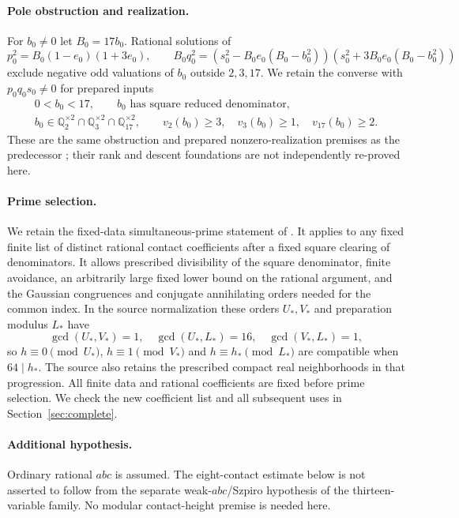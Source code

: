 \documentclass[11pt,a4paper]{article}
\newcommand{\Q}{\mathbb Q}\newcommand{\Z}{\mathbb Z}\DeclareMathOperator{\Tr}{Tr}\DeclareMathOperator{\Nm}{Nm}\DeclareMathOperator{\rad}{rad}
\begin{document}
\paragraph{Pole obstruction and realization.}
For $b_0\ne0$ let $B_0=17b_0$. Rational solutions of
\begin{equation}\label{eq:originalpole}
 p_0^2=B_0(1-e_0)(1+3e_0),\qquad
 B_0q_0^2=(s_0^2-B_0e_0(B_0-b_0^2))(s_0^2+3B_0e_0(B_0-b_0^2))
\end{equation}
exclude negative odd valuations of $b_0$ outside $2,3,17$.
We retain the converse with $p_0q_0s_0\ne0$ for prepared inputs
\begin{equation}\label{eq:prepared}
\begin{gathered}
0<b_0<17,\qquad b_0\text{ has square reduced denominator},\\
b_0\in\Q_2^{\times2}\cap\Q_3^{\times2}\cap\Q_{17}^{\times2},\qquad
v_2(b_0)\ge3,\quad v_3(b_0)\ge1,\quad v_{17}(b_0)\ge2.
\end{gathered}
\end{equation}
These are the same obstruction and prepared nonzero-realization
premises as the predecessor \cite{Old87}; their rank and descent
foundations are not independently re-proved here.

\paragraph{Prime selection.}
We retain the fixed-data simultaneous-prime statement of
\cite{Dependencies,Selection}. It applies to any fixed finite list
of distinct rational contact coefficients after a fixed square
clearing of denominators. It allows prescribed divisibility of the
square denominator, finite avoidance, an arbitrarily large fixed
lower bound on the rational argument, and the Gaussian congruences
and conjugate annihilating orders needed for the common index.
In the source normalization these orders $U_*,V_*$ and preparation
modulus $L_*$ have
\[
\gcd(U_*,V_*)=1,\quad\gcd(U_*,L_*)=16,\quad\gcd(V_*,L_*)=1,
\]
so $h\equiv0\pmod{U_*}$, $h\equiv1\pmod{V_*}$ and
$h\equiv h_*\pmod{L_*}$ are compatible when $64\mid h_*$.
The source also retains the prescribed compact real neighborhoods
in that progression. All finite data and rational coefficients are
fixed before prime selection. We check the new coefficient list and
all subsequent uses in Section~\ref{sec:complete}.

\paragraph{Additional hypothesis.}
Ordinary rational $abc$ is assumed. The eight-contact estimate below
is not asserted to follow from the separate weak-$abc$/Szpiro
hypothesis of the thirteen-variable family. No modular contact-height
premise is needed here.
\end{document}

